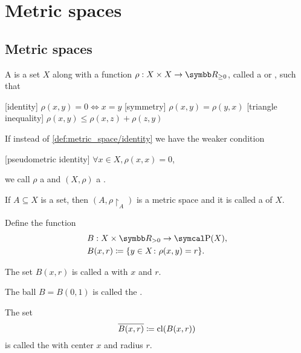 \section{Metric spaces}\label{sec:metric_spaces}
\subsection{Metric spaces}\label{subsec:metric_spaces}

\begin{definition}\label{def:metric_space}\cite[248]{Engelking1989}
  A  is a set \( X \) along with a function \( \rho: X \times X \to \R_{\geq 0} \), called a  or , such that
  \begin{description}
    [identity] \( \rho(x, y) = 0 \iff x = y \)
    [symmetry] \( \rho(x, y) = \rho(y, x) \)
    [triangle inequality] \( \rho(x, y) \leq \rho(x, z) + \rho(z, y) \)
  \end{description}

  If instead of \ref{def:metric_space/identity} we have the weaker condition
  \begin{description}
    [pseudometric identity] \( \forall x \in X, \rho(x, x) = 0 \),
  \end{description}
  we call \( \rho \) a  and \( (X, \rho) \) a .

  \begin{defenum}
     If \( A \subseteq X \) is a set, then \( (A, \rho{\restriction_A}) \) is a metric space and it is called a  of $X$.

     Define the function
    \begin{align*}
      &B: X \times \R_{>0} \to \Power(X), \\
      &B(x, r) \coloneqq \{ y \in X \colon \rho(x, y) = r \}.
    \end{align*}

    The set \( B(x, r) \) is called a  with  \( x \) and  \( r \).

    The ball \( B = B(0, 1) \) is called the .

     The set
    \begin{equation*}
      \overline{B(x, r)} \coloneqq \operatorname{cl}(B(x, r))
    \end{equation*}
    is called the  with center \( x \) and radius \( r \).


\end{defenum}
\end{definition}
